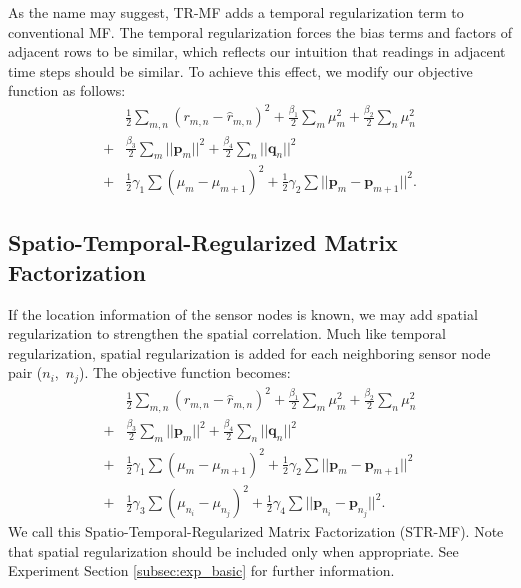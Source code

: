 As the name may suggest, TR-MF adds a temporal regularization term to conventional MF.
The temporal regularization forces the bias terms and factors of adjacent rows to be similar, which reflects our intuition that readings in adjacent time steps should be similar.
To achieve this effect, we modify our objective function as follows: 
\begin{equation*}\begin{aligned}
&\frac{1}{2}\sum_{m,n}{(r_{m,n} - \hat{r}_{m,n})}^2 + \frac{\beta_1}{2}\sum_m{\mu_m^2} + \frac{\beta_2}{2}\sum_n{\mu_n^2}\\
+& \frac{\beta_3}{2}\sum_m{||\mathbf{p}_m||^2} + \frac{\beta_4}{2}\sum_n{||\mathbf{q}_n||^2}\\
+& \frac{1}{2}\gamma_1\sum{(\mu_m-\mu_{m+1})^2} 
+ \frac{1}{2}\gamma_2\sum{||\mathbf{p}_m-\mathbf{p}_{m+1}||^2}.
\end{aligned}\end{equation*}

\subsection{Spatio-Temporal-Regularized Matrix Factorization}
If the location information of the sensor nodes is known, we may add spatial regularization to strengthen the spatial correlation. Much like temporal regularization, spatial regularization is added for each neighboring sensor node pair ($n_i$,~$n_j$).
The objective function becomes: 
\begin{equation*}\begin{aligned}
&\frac{1}{2}\sum_{m,n}{(r_{m,n} - \hat{r}_{m,n})}^2 + \frac{\beta_1}{2}\sum_m{\mu_m^2} + \frac{\beta_2}{2}\sum_n{\mu_n^2}\\
+&\frac{\beta_3}{2}\sum_m{||\mathbf{p}_m||^2} + \frac{\beta_4}{2}\sum_n{||\mathbf{q}_n||^2}\\ 
+&\frac{1}{2}\gamma_1\sum{(\mu_m-\mu_{m+1})^2}
+ \frac{1}{2}\gamma_2\sum{||\mathbf{p}_m-\mathbf{p}_{m+1}||^2}\\
+&\frac{1}{2}\gamma_3\sum{(\mu_{n_i}-\mu_{n_j})^2} 
+ \frac{1}{2}\gamma_4\sum{||\mathbf{p}_{n_i}-\mathbf{p}_{n_j}||^2}.
\end{aligned}\end{equation*}
We call this Spatio-Temporal-Regularized Matrix Factorization (STR-MF). Note that spatial regularization should be included only when appropriate. See Experiment Section \ref{subsec:exp_basic} for further information.

